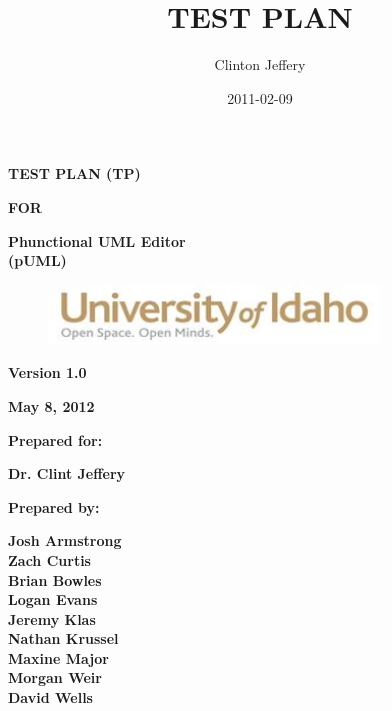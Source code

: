 \documentclass[twoside,letterpaper]{article}
\title{TEST PLAN}
\author{Clinton Jeffery}
\date{2011-02-09}
\begin{document}
\clearpage\setcounter{page}{1}\pagestyle{Standard}
\thispagestyle{FirstPage}

{\centering\bfseries
TEST PLAN (TP)
\par}

{\centering\bfseries
FOR
\par}


\bigskip

{\centering\bfseries
Phunctional UML Editor
\\(pUML)
\par}


\bigskip


\bigskip


\bigskip

{\centering \par}

\begin{figure}
\centering
\includegraphics[width=3.5in]{uidahologo.jpg}
\end{figure}

\bigskip


\bigskip


\bigskip


\bigskip


{\centering\bfseries
Version 1.0
\par}

{\centering\bfseries
May 8, 2012
\par}


\bigskip


\bigskip

{\centering\bfseries
Prepared for:
\par}

{\centering\bfseries
Dr. Clint Jeffery
\par}


\bigskip



{\centering\bfseries
Prepared by:
\par}

{\centering\bfseries
Josh Armstrong
\\Zach Curtis
\\Brian Bowles
\\Logan Evans
\\Jeremy Klas
\\Nathan Krussel
\\Maxine Major
\\Morgan Weir
\\David Wells
\par}
\end{document}
